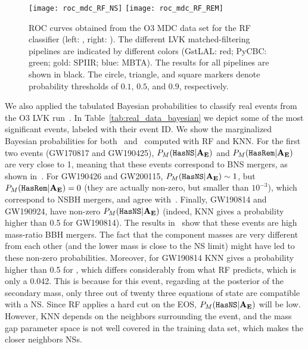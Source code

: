 \begin{figure}%
\texttt{[image: roc\_mdc\_RF\_NS]}
\texttt{[image: roc\_mdc\_RF\_REM]}
\caption{\ac{ROC} curves obtained from the \ac{O3} \ac{MDC} data set for the \ac{RF} classifier (left: \hasns, right: \hasrem). The different \ac{LVK} matched-filtering pipelines are indicated by different colors (GstLAL: red; PyCBC: green; gold: SPIIR; blue: MBTA). The results for all pipelines are shown in black. The circle, triangle, and square markers denote probability thresholds of $0.1$, $0.5$, and $0.9$, respectively.}
\label{fig:rocMDC_RF}
\end{figure}

We also applied the tabulated Bayesian probabilities to classify real events
from the O3 LVK run~\cite{LIGOScientific:2020ibl, LIGOScientific:2021djp}.  In Table~\ref{tab:real_data_bayesian} we depict some of the most significant events, labeled with their event ID.  We show the marginalized Bayesian probabilities for both \hasns\ and \hasrem\ computed with 
\ac{RF} and \ac{KNN}. For the first two events (GW170817 and GW190425),
$P_M({{\tt HasNS}} |\bf{A_E})$ and $P_M({{\tt HasRem}} |\bf{A_E})$ are very close to 1, meaning that these events
correspond to BNS mergers, as shown in~\cite{LIGOScientific:2020ibl,LIGOScientific:2021djp}. 
For GW190426 and GW200115, $P_M({{\tt HasNS}} |{\bf{A_E}}) \sim 1$, but
$P_M({{\tt HasRem}} |{\bf{A_E}}) = 0$ (they are actually non-zero, but smaller than $10^{-3}$), which correspond to NSBH mergers, and agree 
with~\cite{LIGOScientific:2020ibl, LIGOScientific:2021djp}. Finally, GW190814 and GW190924,
have non-zero $P_M({{\tt HasNS}} |\bf{A_E})$ (indeed, \ac{KNN} gives a probability higher than
0.5 for GW190814). The results in~\cite{LIGOScientific:2020ibl,
LIGOScientific:2021djp} show that these events are high mass-ratio BBH mergers.
The fact that the component masses are very different from each other (and the
lower mass is close to the NS limit) might have led to these non-zero
probabilities. Moreover, for GW190814 \ac{KNN} gives a probability higher than
0.5 for \hasns, which differs considerably from what \ac{RF} predicts, which is
only a 0.042. This is because for this event, regarding at the posterior of the
secondary mass, only three out of twenty three equations of state are
compatible with a NS. Since \ac{RF} applies a hard cut on the EOS,
$P_M({{\tt HasNS}}|{\bf A}_{\bf E})$ will be low. However, \ac{KNN} depends on the
neighbors surrounding the event, and the mass gap parameter space is not well
covered in the training data set, which makes the closer neighbors NSs. 

